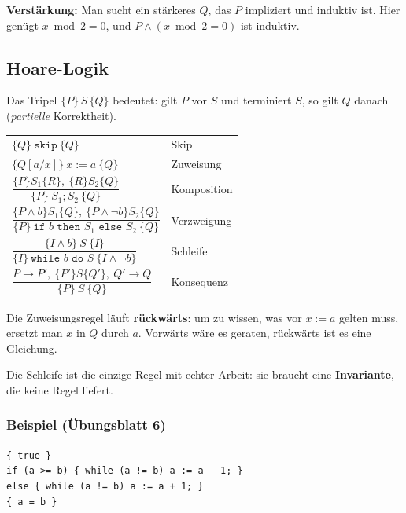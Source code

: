 \documentclass[12pt, a4paper]{article}
\begin{document}
\textbf{Verstärkung:} Man sucht ein stärkeres $Q$, das $P$ impliziert und induktiv
ist. Hier genügt $x \bmod 2 = 0$, und $P \wedge (x \bmod 2 = 0)$ ist induktiv.

\subsection{Hoare-Logik}

\begin{definitionbox}
Das Tripel $\{P\}\, S\, \{Q\}$ bedeutet: gilt $P$ vor $S$ und terminiert $S$, so gilt
$Q$ danach (\emph{partielle} Korrektheit).
\end{definitionbox}

\begin{center}
\begin{tabular}{ll}
\hline
$\{Q\}\ \texttt{skip}\ \{Q\}$ & Skip \\
$\{Q[a/x]\}\ x := a\ \{Q\}$ & Zuweisung \\
$\dfrac{\{P\} S_1 \{R\},\ \{R\} S_2 \{Q\}}{\{P\}\ S_1;S_2\ \{Q\}}$ & Komposition \\[10pt]
$\dfrac{\{P \wedge b\} S_1 \{Q\},\ \{P \wedge \neg b\} S_2 \{Q\}}{\{P\}\ \texttt{if } b \texttt{ then } S_1 \texttt{ else } S_2\ \{Q\}}$ & Verzweigung \\[10pt]
$\dfrac{\{I \wedge b\}\ S\ \{I\}}{\{I\}\ \texttt{while } b \texttt{ do } S\ \{I \wedge \neg b\}}$ & Schleife \\[10pt]
$\dfrac{P \to P',\ \{P'\} S \{Q'\},\ Q' \to Q}{\{P\}\ S\ \{Q\}}$ & Konsequenz \\
\hline
\end{tabular}
\end{center}

Die Zuweisungsregel läuft \textbf{rückwärts}: um zu wissen, was vor $x := a$ gelten
muss, ersetzt man $x$ in $Q$ durch $a$. Vorwärts wäre es geraten, rückwärts ist es
eine Gleichung.

Die Schleife ist die einzige Regel mit echter Arbeit: sie braucht eine
\textbf{Invariante}, die keine Regel liefert.

\subsubsection*{Beispiel (Übungsblatt 6)}

\begin{center}
\begin{minipage}{0.62\textwidth}
\small
\texttt{\{ true \}}\\
\texttt{if (a >= b) \{ while (a != b) a := a - 1; \}}\\
\texttt{else \{ while (a != b) a := a + 1; \}}\\
\texttt{\{ a = b \}}
\end{minipage}
\end{center}
\end{document}
